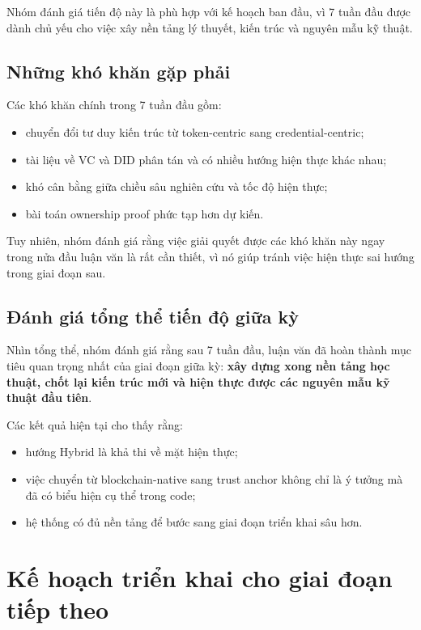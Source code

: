 Nhóm đánh giá tiến độ này là phù hợp với kế hoạch ban đầu, vì 7 tuần đầu được dành chủ yếu cho việc xây nền tảng lý thuyết, kiến trúc và nguyên mẫu kỹ thuật.

\subsection{Những khó khăn gặp phải}

Các khó khăn chính trong 7 tuần đầu gồm:
\begin{itemize}
    \item chuyển đổi tư duy kiến trúc từ token-centric sang credential-centric;
    \item tài liệu về VC và DID phân tán và có nhiều hướng hiện thực khác nhau;
    \item khó cân bằng giữa chiều sâu nghiên cứu và tốc độ hiện thực;
    \item bài toán ownership proof phức tạp hơn dự kiến.
\end{itemize}

Tuy nhiên, nhóm đánh giá rằng việc giải quyết được các khó khăn này ngay trong nửa đầu luận văn là rất cần thiết, vì nó giúp tránh việc hiện thực sai hướng trong giai đoạn sau.

\subsection{Đánh giá tổng thể tiến độ giữa kỳ}

Nhìn tổng thể, nhóm đánh giá rằng sau 7 tuần đầu, luận văn đã hoàn thành mục tiêu quan trọng nhất của giai đoạn giữa kỳ: \textbf{xây dựng xong nền tảng học thuật, chốt lại kiến trúc mới và hiện thực được các nguyên mẫu kỹ thuật đầu tiên}.

Các kết quả hiện tại cho thấy rằng:
\begin{itemize}
    \item hướng Hybrid là khả thi về mặt hiện thực;
    \item việc chuyển từ blockchain-native sang trust anchor không chỉ là ý tưởng mà đã có biểu hiện cụ thể trong code;
    \item hệ thống có đủ nền tảng để bước sang giai đoạn triển khai sâu hơn.
\end{itemize}

\section{Kế hoạch triển khai cho giai đoạn tiếp theo}

